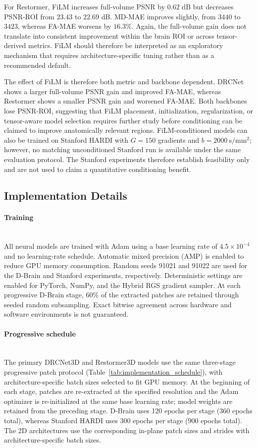 \documentclass[preprint,12pt]{elsarticle}
\begin{document}
For Restormer, FiLM increases full-volume PSNR by $0.62$ dB but decreases PSNR-ROI from $23.43$ to $22.69$ dB. MD-MAE improves slightly, from $3440$ to $3423$, whereas FA-MAE worsens by $16.3\%$. Again, the full-volume gain does not translate into consistent improvement within the brain ROI or across tensor-derived metrics. FiLM should therefore be interpreted as an exploratory mechanism that requires architecture-specific tuning rather than as a recommended default.

The effect of FiLM is therefore both metric and backbone dependent. DRCNet shows a larger full-volume PSNR gain and improved FA-MAE, whereas Restormer shows a smaller PSNR gain and worsened FA-MAE. Both backbones lose PSNR-ROI, suggesting that FiLM placement, initialization, regularization, or tensor-aware model selection requires further study before conditioning can be claimed to improve anatomically relevant regions. FiLM-conditioned models can also be trained on Stanford HARDI with $G=150$ gradients and $b=2000~\mathrm{s/mm^2}$; however, no matching unconditioned Stanford run is available under the same evaluation protocol. The Stanford experiments therefore establish feasibility only and are not used to claim a quantitative conditioning benefit.

\subsection{Implementation Details}
\paragraph{Training}\mbox{}\\
All neural models are trained with Adam using a base learning rate of $4.5 \times 10^{-4}$ and no learning-rate schedule. Automatic mixed precision (AMP) is enabled to reduce GPU memory consumption. Random seeds 91021 and 91022 are used for the D-Brain and Stanford experiments, respectively. Deterministic settings are enabled for PyTorch, NumPy, and the Hybrid RGS gradient sampler. At each progressive D-Brain stage, $60\%$ of the extracted patches are retained through seeded random subsampling. Exact bitwise agreement across hardware and software environments is not guaranteed.

\paragraph{Progressive schedule}\mbox{}\\
The primary DRCNet3D and Restormer3D models use the same three-stage progressive patch protocol (Table~\ref{tab:implementation_schedule}), with architecture-specific batch sizes selected to fit GPU memory. At the beginning of each stage, patches are re-extracted at the specified resolution and the Adam optimizer is re-initialized at the same base learning rate; model weights are retained from the preceding stage. D-Brain uses 120 epochs per stage (360 epochs total), whereas Stanford HARDI uses 300 epochs per stage (900 epochs total). The 2D architectures use the corresponding in-plane patch sizes and strides with architecture-specific batch sizes.
\end{document}
